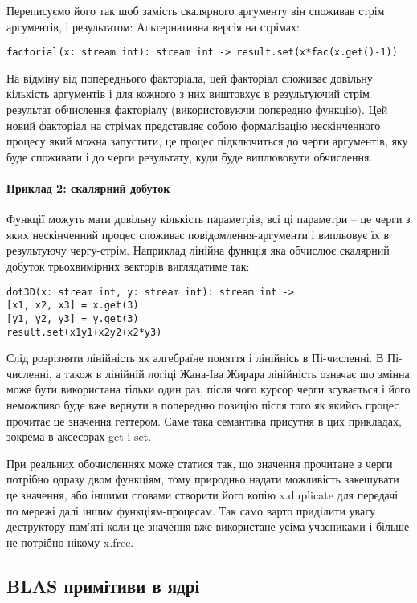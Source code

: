 \documentclass{article}
\begin{document}
Переписуємо його так шоб замість скалярного аргументу він споживав стрім аргументів, і результатом:
Альтернативна версія на стрімах:
\begin{lstlisting}
factorial(x: stream int): stream int -> result.set(x*fac(x.get()-1))
\end{lstlisting}

На відміну від попереднього факторіала, цей факторіал споживає
довільну кількість аргументів і для кожного з них виштовхує в
результуючий стрім результат обчислення факторіалу (використовуючи
попередню функцію). Цей новий факторіал на стрімах представляє собою
формалізацію нескінченного процесу який можна запустити,
це процес підключиться до черги аргументів, яку буде споживати
і до черги результату, куди буде виплювовути обчислення.

\paragraph{Приклад 2: скалярний добуток}
Функції можуть мати довільну кількість параметрів, всі ці параметри
-- це черги з яких нескінченний процес споживає повідомлення-аргументи
і випльовує їх в результуючу чергу-стрім. Наприклад лінійна
функція яка обчислює скалярний добуток трьохвимірних векторів виглядатиме так:

\begin{lstlisting}
dot3D(x: stream int, y: stream int): stream int ->
[x1, x2, x3] = x.get(3)
[y1, y2, y3] = y.get(3)
result.set(x1y1+x2y2+x2*y3)
\end{lstlisting}

Слід розрізняти лінійність як алгебраїне поняття і лінійнісь в Пі-численні.
В Пі-численні, а також в лінійній логіці Жана-Іва Жирара лінійність означає
шо змінна може бути використана тільки один раз, після чого курсор черги
зсувається і його неможливо буде вже вернути в попередню позицію після того
як якийсь процес прочитає це значення геттером. Саме така семантика присутня
в цих прикладах, зокрема в аксесорах get і set.

При реальних обочисленнях може статися так, що значення прочитане з черги
потрібно одразу двом функціям, тому природньо надати можливість закешувати
це значення, або іншими словами створити його копію x.duplicate для передачі
по мережі далі іншим функціям-процесам. Так само варто приділити увагу
деструктору пам'яті коли це значення вже використане усіма учасниками
і більше не потрібно нікому x.free.

\subsection{BLAS примітиви в ядрі}
\end{document}
